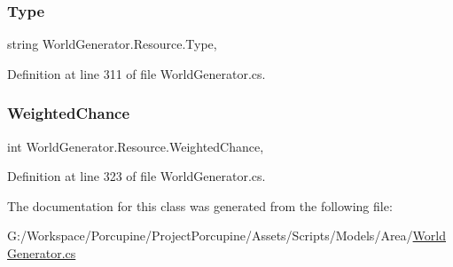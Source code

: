 \subsubsection{\texorpdfstring{Type}{Type}}
{\footnotesize\ttfamily string World\+Generator.\+Resource.\+Type\hspace{0.3cm}{\ttfamily [get]}, {\ttfamily [set]}}



Definition at line 311 of file World\+Generator.\+cs.

\mbox{\label{class_world_generator_1_1_resource_a8f0af5ce2c0a6f288588e6c5ad21695e}} 
\subsubsection{\texorpdfstring{Weighted\+Chance}{WeightedChance}}
{\footnotesize\ttfamily int World\+Generator.\+Resource.\+Weighted\+Chance\hspace{0.3cm}{\ttfamily [get]}, {\ttfamily [set]}}



Definition at line 323 of file World\+Generator.\+cs.



The documentation for this class was generated from the following file\+:\begin{DoxyCompactItemize}
\item 
G\+:/\+Workspace/\+Porcupine/\+Project\+Porcupine/\+Assets/\+Scripts/\+Models/\+Area/\hyperlink{_world_generator_8cs}{World\+Generator.\+cs}\end{DoxyCompactItemize}
